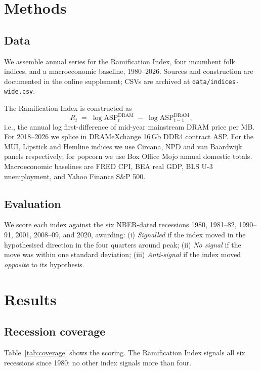 \documentclass[11pt,a4paper]{article}
\begin{document}
\section{Methods}\label{sec:method}

\subsection{Data}

We assemble annual series for the Ramification Index, four incumbent folk indices, and a macroeconomic baseline, 1980--2026. Sources and construction are documented in the online supplement; CSVs are archived at \verb|data/indices-wide.csv|.

The Ramification Index is constructed as
\[
  R_t \;=\; \log \mathrm{ASP}^{\mathrm{DRAM}}_t \;-\; \log \mathrm{ASP}^{\mathrm{DRAM}}_{t-1},
\]
i.e., the annual log first-difference of mid-year mainstream DRAM price per MB. For 2018--2026 we splice in DRAMeXchange 16\,Gb DDR4 contract ASP. For the MUI, Lipstick and Hemline indices we use Circana, NPD and van Baardwijk panels respectively; for popcorn we use Box Office Mojo annual domestic totals. Macroeconomic baselines are FRED CPI, BEA real GDP, BLS U-3 unemployment, and Yahoo Finance S\&P 500.

\subsection{Evaluation}

We score each index against the six NBER-dated recessions 1980, 1981--82, 1990--91, 2001, 2008--09, and 2020, awarding:
(i) \emph{Signalled} if the index moved in the hypothesised direction in the four quarters around peak;
(ii) \emph{No signal} if the move was within one standard deviation;
(iii) \emph{Anti-signal} if the index moved \emph{opposite} to its hypothesis.

\section{Results}\label{sec:results}

\subsection{Recession coverage}

Table~\ref{tab:coverage} shows the scoring. The Ramification Index signals all six recessions since 1980; no other index signals more than four.
\end{document}
